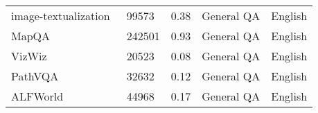 \begin{table}[h]
\begin{tabular}{l|l|l|l|l}
image-textualization~\cite{pi2024image}            & 99573   & 0.38     & General QA   & English         \\
MapQA~\cite{chang2022mapqa}                           & 242501  & 0.93     & General QA   & English         \\
VizWiz~\cite{2018VizWiz}                          & 20523   & 0.08     & General QA   & English         \\
PathVQA~\cite{he2020pathvqa}                         & 32632   & 0.12     & General QA   & English         \\
ALFWorld~\cite{ALFWorld20}                        & 44968   & 0.17     & General QA   & English         \\
\bottomrule
\end{tabular}
\end{table}


